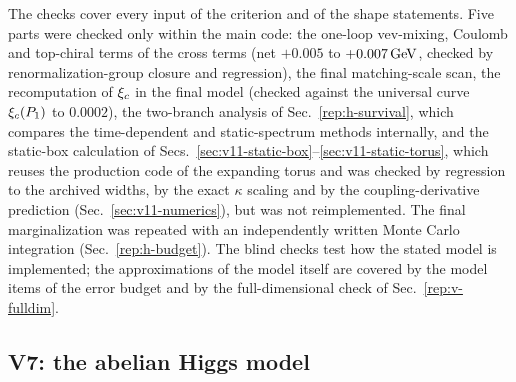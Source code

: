 The checks cover every input of the criterion and of the shape statements.
Five parts were checked only within the main code: the one-loop vev-mixing, Coulomb and top-chiral terms of the cross terms (net $+0.005$ to $+0.007\,\mathrm{GeV}$, checked by renormalization-group closure and regression), the final matching-scale scan, the recomputation of $\xi_c$ in the final model (checked against the universal curve $\xi_c(P_1)$ to $0.0002$), the two-branch analysis of Sec.~\ref{rep:h-survival}, which compares the time-dependent and static-spectrum methods internally, and the static-box calculation of Secs.~\ref{sec:v11-static-box}--\ref{sec:v11-static-torus}, which reuses the production code of the expanding torus and was checked by regression to the archived widths, by the exact $\kappa$ scaling and by the coupling-derivative prediction (Sec.~\ref{sec:v11-numerics}), but was not reimplemented. %
The final marginalization was repeated with an independently written Monte Carlo integration (Sec.~\ref{rep:h-budget}).
The blind checks test how the stated model is implemented; the approximations of the model itself are covered by the model items of the error budget and by the full-dimensional check of Sec.~\ref{rep:v-fulldim}.

\subsection{V7: the abelian Higgs model}\label{sec:v11-blind-abelian}


